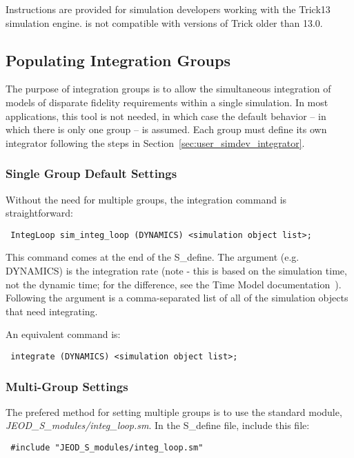 Instructions are provided for simulation developers working with the Trick13
simulation engine.  \JEODidx is not compatible with versions of Trick older than 13.0.

\subsection{Populating Integration Groups}\label{sec:user_simdev_groups}
The purpose of integration groups is to
allow the simultaneous integration of models of disparate fidelity
requirements within a single simulation.  In most applications, this tool is
not needed, in which case the default behavior  -- in which there is
only one group -- is assumed.  Each group must define its own integrator
following the steps in
Section~\ref{sec:user_simdev_integrator}.

\subsubsection{Single Group Default Settings}
Without the need for multiple groups, the integration command is
straightforward:

\begin{verbatim}
 IntegLoop sim_integ_loop (DYNAMICS) <simulation object list>;
\end{verbatim}

This command comes at the end of the S\_define.  The argument (e.g. DYNAMICS)
is the integration rate (note - this is based on the simulation time, not the
dynamic time; for the difference, see the Time Model
documentation~\cite{dynenv:TIME}).  Following the argument is a
comma-separated list of all of the simulation objects that need integrating.

An equivalent command is:
\begin{verbatim}
 integrate (DYNAMICS) <simulation object list>;
\end{verbatim}


\subsubsection{Multi-Group Settings}

The prefered method for setting multiple groups is to use the standard module,
\textit{JEOD\_S\_modules/integ\_loop.sm}.  In the S\_define file, include this
file:
\begin{verbatim}
 #include "JEOD_S_modules/integ_loop.sm"
\end{verbatim}

